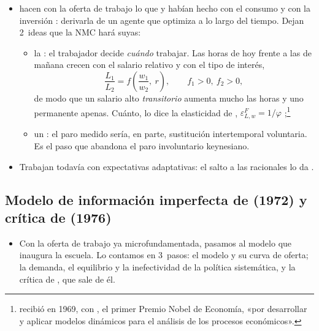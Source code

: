 \documentclass[11pt]{article}
\begin{document}
\begin{itemize}
\item \textcite{LucasRapping1969Real} hacen con la oferta de trabajo lo que  y  habían hecho con el consumo  y  con la inversión : derivarla de un agente que optimiza a lo largo del tiempo. Dejan 2~ideas que la NMC hará suyas:
  \begin{itemize}
  \item la : el trabajador decide \emph{cuándo} trabajar. Las horas de hoy frente a las de mañana crecen con el salario relativo y con el tipo de interés,
    \begin{equation}\label{eq:lucas-rapping}
    \frac{L_1}{L_2}=f\left(\frac{w_1}{w_2},\ r\right),\qquad f_1>0,\ f_2>0,
    \end{equation}
    de modo que un salario alto \emph{transitorio} aumenta mucho las horas y uno permanente apenas. Cuánto, lo dice la elasticidad de , $\varepsilon^F_{L,w}=1/\varphi$ ;\footnote{ recibió en 1969, con , el primer Premio Nobel de Economía, «por desarrollar y aplicar modelos dinámicos para el análisis de los procesos económicos»\nocite{Nobel1969}.}
  \item un : el paro medido sería, en parte, sustitución intertemporal voluntaria. Es el paso que abandona el paro involuntario keynesiano.
  \end{itemize}
\item Trabajan todavía con expectativas adaptativas: el salto a las racionales lo da \textcite{Lucas1972Expectations}.
\end{itemize}

\subsection{Modelo de información imperfecta de  (1972) y crítica de  (1976)}\label{sec:lucas-islas}

\begin{itemize}
\item Con la oferta de trabajo ya microfundamentada, pasamos al modelo que inaugura la escuela. Lo contamos en 3~pasos: el modelo y su curva de oferta; la demanda, el equilibrio y la inefectividad de la política sistemática, y la crítica de , que sale de él.
\end{itemize}
\end{document}

